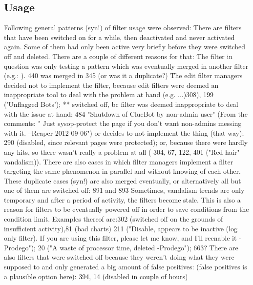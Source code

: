 \subsection{Usage}

Following general patterns (syn!) of filter usage were observed:
There are filters that have been switched on for a while, then deactivated and never activated again.
Some of them had only been active very briefly before they were switched off and deleted.
There are a couple of different reasons for that:
The filter in question was only testing a pattern which was eventually merged in another filter (e.g.: ). 440 was merged in 345 (or was it a duplicate?)
The edit filter managers decided not to implement the filter, because edit filters were deemed an inappropriate tool to deal with the problem at hand (e.g. ...)308), 199 ('Unflagged Bots');
  ** switched off, bc filter was deemed inappropriate to deal with the issue at hand: 484 "Shutdown of ClueBot by non-admin user" (From the comments: " Just sysop-protect the page if you don't want non-admins messing with it. --Reaper 2012-09-06")
or decides to not implement the thing (that way); 290 (disabled, since relevant pages were protected);
or, because there were hardly any hits, so there wasn't really a problem at all ( 304, 67, 122, 401 ("Red hair" vandalism)). %
There are also cases in which filter managers implement a filter targeting the same phenomenon in parallel and without knowing of each other.
These duplicate cases (syn!) are also merged eventually, or alternatively all but one of them are switched off: 891 and 893
Sometimes, vandalism trends are only temporary and after a period of activity, the filters become stale.
This is also a reason for filters to be eventually powered off in order to save conditions from the condition limit.
Examples thereof are:302 (switched off on the grounds of insufficient activity),81 (bad charts)
 211 ("Disable, appears to be inactive (log only filter). If you are using this filter, please let me know, and I'll reenable it -Prodego"); 20 ("A waste of processor time, deleted -Prodego"); 663?
There are also filters that were switched off because they weren't doing what they were supposed to and only generated a big amount of false positives: (false positives is a plausible option here): 394,  14 (disabled in couple of hours)

